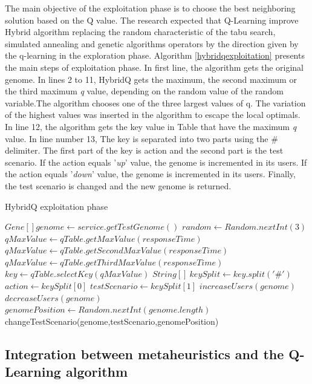 \documentclass{report}
\begin{document}
The main objective of the exploitation phase is to choose the best neighboring solution based on the Q value. The research expected that Q-Learning improve Hybrid algorithm replacing the random characteristic of the tabu search, simulated  annealing and genetic algorithms operators by the direction given by the q-learning in the exploration phase. Algorithm \ref{hybridqexploitation} presents the main steps of exploitation phase. In first line, the algorithm gets the original genome. In lines 2 to 11, HybridQ gets the maximum, the second maximum or the third maximum \textit{q} value, depending on the random value of the random variable.The algorithm chooses one of the three largest values of q. The variation of the highest values was inserted in the algorithm to escape the local optimals. In line 12, the algorithm gets the key value in Table that have the maximum \textit{q} value. In line number 13, The key is separated into two parts using the \# delimiter. The first part of the key is action and the second part is the test scenario. If the action equals '\textit{up}' value, the genome is incremented in its users. If the action equals '\textit{down}' value, the genome is incremented in its users. Finally, the test scenario is changed and the new genome is returned.




\begin{algorithm}[h]
  \caption{HybridQ exploitation phase }\label{hybridqexploitation}
  \begin{algorithmic}[1]
    \State $Gene[] genome \gets service.getTestGenome()$
    \State $random \gets Random.nextInt(3)$
    \State $qMaxValue \gets qTable.getMaxValue(responseTime)$
    \EndIf
    \State $qMaxValue \gets qTable.getSecondMaxValue(responseTime)$
    \EndIf
    \State $qMaxValue \gets qTable.getThirdMaxValue(responseTime)$
    \EndIf
    \State $key \gets qTable.selectKey(qMaxValue)$
    \State $String[]\  keySplit \gets key.split('\#')$
    \State $action \gets keySplit[0]$
    \State $testScenario \gets keySplit[1]$
    \State $ increaseUsers(genome) $
    \EndIf
    \State $ decreaseUsers(genome) $
    \EndIf
    \State $genomePosition \gets Random.nextInt(genome.length)$
    \State changeTestScenario(genome,testScenario,genomePosition)
  \end{algorithmic}
\end{algorithm}

\subsection{Integration between metaheuristics and the Q-Learning algorithm }
\end{document}
